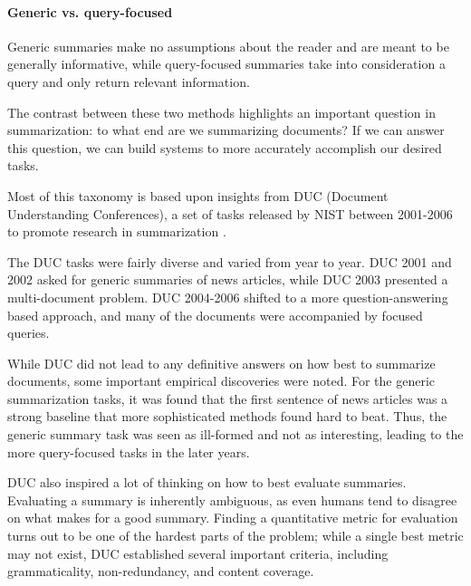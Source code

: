 \documentclass[12pt]{report}
\begin{document}

\paragraph{Generic vs. query-focused} Generic summaries make no assumptions about the reader and are meant to be generally informative, while query-focused summaries take into consideration a query and only return relevant information.

The contrast between these two methods highlights an important question in summarization: to what end are we summarizing documents? If we can answer this question, we can build systems to more accurately accomplish our desired tasks.

\vspace{0.5cm}


Most of this taxonomy is based upon insights from DUC (Document Understanding Conferences), a set of tasks released by NIST between 2001-2006 to promote research in summarization \citep{over2007duc}.

The DUC tasks were fairly diverse and varied from year to year. DUC 2001 and 2002 asked for generic summaries of news articles, while DUC 2003 presented a multi-document problem. DUC 2004-2006 shifted to a more question-answering based approach, and many of the documents were accompanied by focused queries.

While DUC did not lead to any definitive answers on how best to summarize documents, some important empirical discoveries were noted.
For the generic summarization tasks, it was found that the first sentence of news articles was a strong baseline that more sophisticated methods found hard to beat. Thus, the generic summary task was seen as ill-formed and not as interesting, leading to the more query-focused tasks in the later years.


DUC also inspired a lot of thinking on how to best evaluate summaries. Evaluating a summary is inherently ambiguous, as even humans tend to disagree on what makes for a good summary.
Finding a quantitative metric for evaluation turns out to be one of the hardest parts of the problem; while a single best metric may not exist, DUC established several important criteria, including grammaticality, non-redundancy, and content coverage.
\end{document}
